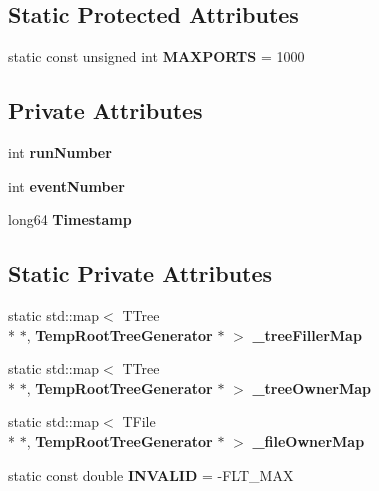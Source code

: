 \subsection*{Static Protected Attributes}
\begin{DoxyCompactItemize}
\item 
static const unsigned int {\bfseries M\-A\-X\-P\-O\-R\-T\-S} = 1000\label{classCALICE_1_1TempRootTreeGenerator_ab2162b267c9e1f26729de736c4b2bf8d}

\end{DoxyCompactItemize}
\subsection*{Private Attributes}
\begin{DoxyCompactItemize}
\item 
int {\bfseries run\-Number}\label{classCALICE_1_1TempRootTreeGenerator_ab6b2729ac1b292d2ee2fea66a9594703}

\item 
int {\bfseries event\-Number}\label{classCALICE_1_1TempRootTreeGenerator_a9d25e5c9fd0dbb2f75e1a3e149e45169}

\item 
long64 {\bfseries Timestamp}\label{classCALICE_1_1TempRootTreeGenerator_a987d676226994b2120f47c457551ba09}

\end{DoxyCompactItemize}
\subsection*{Static Private Attributes}
\begin{DoxyCompactItemize}
\item 
static std\-::map$<$ T\-Tree \\*
$\ast$, {\bf Temp\-Root\-Tree\-Generator} $\ast$ $>$ {\bfseries \-\_\-tree\-Filler\-Map}\label{classCALICE_1_1TempRootTreeGenerator_a5aecfdab878099a4ea0a74e4b96652de}

\item 
static std\-::map$<$ T\-Tree \\*
$\ast$, {\bf Temp\-Root\-Tree\-Generator} $\ast$ $>$ {\bfseries \-\_\-tree\-Owner\-Map}\label{classCALICE_1_1TempRootTreeGenerator_a991022195e98911f7e5674c9ad674cce}

\item 
static std\-::map$<$ T\-File \\*
$\ast$, {\bf Temp\-Root\-Tree\-Generator} $\ast$ $>$ {\bfseries \-\_\-file\-Owner\-Map}\label{classCALICE_1_1TempRootTreeGenerator_acf9f072ece6ac7300b4a6ef878bdb947}

\item 
static const double {\bfseries I\-N\-V\-A\-L\-I\-D} = -\/F\-L\-T\-\_\-\-M\-A\-X\label{classCALICE_1_1TempRootTreeGenerator_ab51bc9fd4548675bdad7f48208a3c943}

\end{DoxyCompactItemize}


